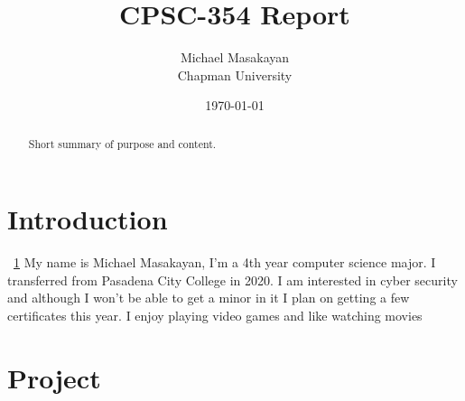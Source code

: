 \documentclass{article}
\title{CPSC-354 Report}
\author{Michael Masakayan  \\ Chapman University}
\date{\today}
\theoremstyle{theorem}
\theoremstyle{definition}
\theoremstyle{remark}
\begin{document}
\maketitle

\begin{abstract}
Short  summary of purpose and content.  
\end{abstract}
\tableofcontents


\section{Introduction}\label{intro}

~\ref{intro} My name is Michael Masakayan, I'm a 4th year computer science major. I transferred from Pasadena City College in 2020. I am interested in cyber security and although I won't be able to get a minor in it I plan on getting a few certificates this year. I enjoy playing video games and like watching movies

\section{Project}\label{Project}
\end{document}
